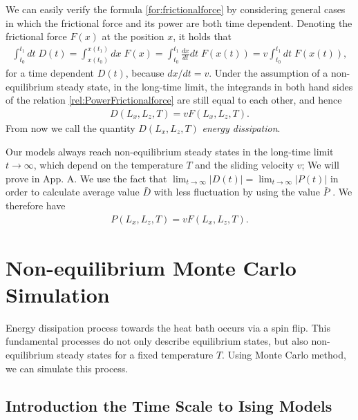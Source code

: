 We can easily verify the formula \eqref{for:frictionalforce} by considering general cases in which the frictional force and its power are both time dependent. Denoting the frictional force $F(x)$ at the position $x$, it holds that
\begin{align}
\int_{t_{0}}^{t_{1}}dt\;D(t)=\int_{x(t_{0})}^{x(t_{1})}dx\;F(x)=\int_{t_{0}}^{t_{1}}\frac{dx}{dt}dt\;F(x(t))=v\int_{t_{0}}^{t_{1}}dt\;F(x(t))\label{rel:PowerFrictionalforce},
\end{align}
for a time dependent $D(t)$, because $dx/dt=v$. Under the assumption of a non-equilibrium steady state, in the long-time limit, the integrands in both hand sides of the relation \eqref{rel:PowerFrictionalforce} are still equal to each other, and hence 
\begin{align}
D(L_{x}, L_{z}, T)=vF(L_{x}, L_{z}, T).
\end{align}
From now we call the quantity $D(L_{x}, L_{z}, T)$ \textit{energy dissipation}.

Our models always reach non-equilibrium steady states in the long-time limit $t\to\infty$, which depend on the temperature $T$ and the sliding velocity $v$; We will prove in App. A. We use the fact that $\lim_{t\to\infty}|D(t)|=\lim_{t\to\infty}|P(t)|$ in order to calculate average value $\bar{D}$ with less fluctuation by using the value $\bar{P}$ \cite{Magiera2009a, Magiera2011, Magiera2011b}. We therefore have
\begin{align}
P(L_{x}, L_{z}, T)=vF(L_{x}, L_{z}, T)\label{for:frictionalforce2}.
\end{align}

\section{Non-equilibrium Monte Carlo Simulation}

Energy dissipation process towards the heat bath occurs via a spin flip. This fundamental processes do not only describe equilibrium states, but also non-equilibrium steady states for a fixed temperature $T$\cite{Glauber1963}. Using Monte Carlo method, we can simulate this process.

\subsection{Introduction the Time Scale to Ising Models}

